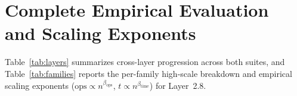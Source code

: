 \documentclass[11pt]{article}
\begin{document}
\section{Complete Empirical Evaluation and Scaling Exponents}

Table~\ref{tab:layers} summarizes cross-layer progression across both suites, and Table~\ref{tab:families} reports the per-family high-scale breakdown and empirical scaling exponents ($\text{ops} \propto n^{\beta_{\text{ops}}}$, $t \propto n^{\beta_{\text{time}}}$) for Layer~2.8.

\begin{table}[t]
\centering
\caption{Cross-layer progression on the 140-instance parity suite ($n \le 60$) and 72-instance high-scale suite ($n \in \{150, 300, 600\}$). Abbreviations: \texttt{Z-CP} (integer cutting planes), \texttt{FLE} (depth-1 Failed-Literal Elimination), \texttt{NG} (nogood learning), \texttt{WS} (WalkSAT polish). Across all layers, false-SAT, false-UNSAT, and overflow counts are identically~$0$.}
\label{tab:layers}
\end{table}
\end{document}
